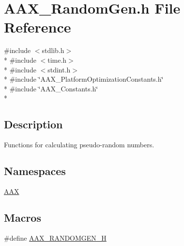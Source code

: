 \hypertarget{a00289}{}\section{A\+A\+X\+\_\+\+Random\+Gen.\+h File Reference}
\label{a00289}
{\ttfamily \#include $<$stdlib.\+h$>$}\\*
{\ttfamily \#include $<$time.\+h$>$}\\*
{\ttfamily \#include $<$stdint.\+h$>$}\\*
{\ttfamily \#include \char`\"{}A\+A\+X\+\_\+\+Platform\+Optimization\+Constants.\+h\char`\"{}}\\*
{\ttfamily \#include \char`\"{}A\+A\+X\+\_\+\+Constants.\+h\char`\"{}}\\*


\subsection{Description}
Functions for calculating pseudo-\/random numbers. 

\subsection*{Namespaces}
\begin{DoxyCompactItemize}
\item 
 \hyperlink{a00288}{A\+A\+X}
\end{DoxyCompactItemize}
\subsection*{Macros}
\begin{DoxyCompactItemize}
\item 
\#define \hyperlink{a00289_a037b85bd9c13c42dee11b4016fa2d90a}{A\+A\+X\+\_\+\+R\+A\+N\+D\+O\+M\+G\+E\+N\+\_\+\+H}
\end{DoxyCompactItemize}

